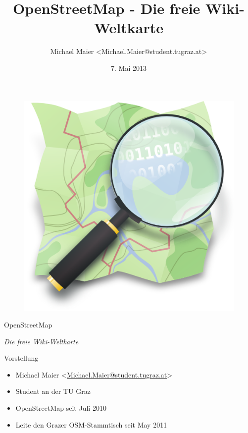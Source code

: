 \documentclass{beamer}
\title{OpenStreetMap - Die freie Wiki-Weltkarte}
\author{Michael Maier \textless Michael.Maier@student.tugraz.at\textgreater}
\date{7. Mai 2013}
\begin{document}

\begin{frame} 


\begin{figure}
  \centering
  \includegraphics[width=.5\textwidth]{mag_map.png}
\end{figure}

\begin{center}
\Huge{OpenStreetMap\\}
\end{center}

\begin{center}
\Large{\emph{Die freie Wiki-Weltkarte}}
\end{center}

\end{frame}



\begin{frame}{Vorstellung}

  \begin{itemize}
    \item Michael Maier \textless \href{mailto:Michael.Maier@student.tugraz.at}{Michael.Maier@student.tugraz.at}\textgreater
    \item Student an der TU Graz 
    \item OpenStreetMap seit Juli 2010
    \item Leite den Grazer OSM-Stammtisch seit May 2011
  \end{itemize}
\end{frame}
\end{document}
